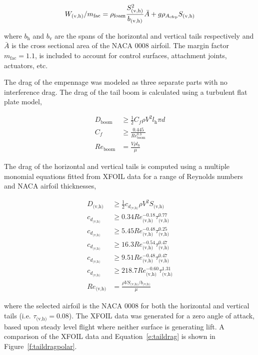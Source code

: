 \begin{equation}
    W_{\text{(v,h)}}/m_{\text{fac}} = \rho_{\text{foam}} \frac{S_{\text{(v,h)}}^2}{b_{\text{(v,h)}}} \bar{A} + g\rho_{A_{\text{cfrp}}} S_{\text{(v,h)}} \\
\end{equation}

where $b_{\text{h}}$ and $b_{\text{v}}$ are the spans of the horizontal and vertical tails respectively and $\bar{A}$ is the cross sectional area of the NACA 0008 airfoil. The margin factor $m_{\text{fac}}=1.1$, is included to account for control surfaces, attachment joints, actuators, etc. 

The drag of the empennage was modeled as three separate parts with no interference drag.  The drag of the tail boom is calculated using a turbulent flat plate model,

\begin{align}
    \label{e:boomdrag}
    D_{\text{boom}} &\geq \frac{1}{2} C_f \rho V^2 l_{\text{h}}\pi d \\
    C_f &\geq \frac{0.445}{Re_{\text{boom}}^{0.3}} \\
    Re_{\text{boom}} &= \frac{V\rho l_{\text{h}}}{\mu}
\end{align}

The drag of the horizontal and vertical tails is computed using a multiple monomial equations fitted from XFOIL data for a range of Reynolds numbers and NACA airfoil thicknesses,

\begin{align}
    D_{\text{(v,h)}} &\geq \frac{1}{2} c_{d_{\text{(v,h)}}} \rho V^2 S_{\text{(v,h)}} \\
    \label{e:taildrag}
    c_{d_{\text{(v,h)}}} &\geq 0.34 Re_{\text{(v,h)}}^{-0.18} \tau_{\text{(v,h)}}^{0.77} \\
    c_{d_{\text{(v,h)}}} &\geq 5.45 Re_{\text{(v,h)}}^{-0.48} \tau_{\text{(v,h)}}^{0.25} \\
    c_{d_{\text{(v,h)}}} &\geq 16.3 Re_{\text{(v,h)}}^{-0.54} \tau_{\text{(v,h)}}^{0.47} \\
    c_{d_{\text{(v,h)}}} &\geq 9.51 Re_{\text{(v,h)}}^{-0.48} \tau_{\text{(v,h)}}^{0.47} \\
    c_{d_{\text{(v,h)}}} &\geq 218.7 Re_{\text{(v,h)}}^{-0.60} \tau_{\text{(v,h)}}^{1.31} \\
    Re_{\text{(v,h)}} &= \frac{\rho V S_{\text{(v,h)}}/b_{\text{(v,h)}}}{\mu}
\end{align}

where the selected airfoil is the NACA 0008 for both the horizontal and vertical tails (i.e. $\tau_{\text{(v,h)}} = 0.08$). 
The XFOIL data was generated for a zero angle of attack, based upon steady level flight where neither surface is generating lift.  
A comparison of the XFOIL data and Equation~\eqref{e:taildrag} is shown in Figure~\ref{f:taildragpolar}.

